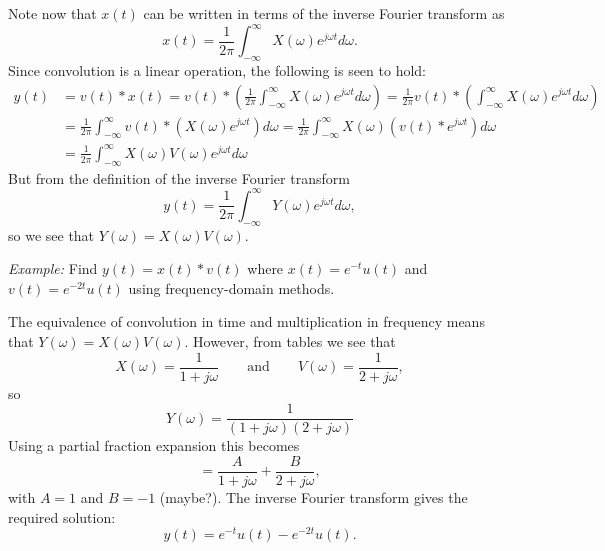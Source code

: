 \documentclass[10pt]{beamer}
\newcommand{\conv}{\ast}
\begin{document}
Note now that $x(t)$ can be written in terms of the inverse Fourier transform as
\begin{equation*}
  x(t) = \frac{1}{2 \pi} \int_{-\infty}^{\infty} X(\omega) e^{j \omega t} d\omega.
\end{equation*}
Since convolution is a linear operation, the following is seen to hold:
\begin{align*}
  y(t) &= v(t) \conv x(t) 
  = v(t) \conv \left( \frac{1}{2 \pi} \int_{-\infty}^{\infty} X(\omega) e^{j \omega t} d\omega \right)
  = \frac{1}{2 \pi} v(t) \conv \left( \int_{-\infty}^{\infty} X(\omega) e^{j \omega t} d\omega \right) \\
  &= \frac{1}{2 \pi} \int_{-\infty}^{\infty} v(t) \conv \left( X(\omega) e^{j \omega t} \right) d\omega 
  = \frac{1}{2 \pi} \int_{-\infty}^{\infty} X(\omega) \left( v(t) \conv e^{j \omega t} \right) d\omega \\
  &= \frac{1}{2 \pi} \int_{-\infty}^{\infty} X(\omega) V(\omega) e^{j \omega t} d\omega 
\end{align*}
But from the definition of the inverse Fourier transform 
\begin{equation*}
  y(t) = \frac{1}{2 \pi} \int_{-\infty}^{\infty} Y(\omega) e^{j \omega t} d\omega,
\end{equation*}
so we see that $Y(\omega) = X(\omega) V(\omega)$.

{\em Example:}  Find $y(t) = x(t) \conv v(t)$ where $x(t) = e^{-t} u(t)$ and $v(t) = e^{-2t} u(t)$ using frequency-domain methods.

The equivalence of convolution in time and multiplication in frequency means that $Y(\omega) = X(\omega) V(\omega)$.  However, from tables we see that
\begin{equation*}
  X(\omega) = \frac{1}{1 + j \omega} \qquad \text{and} \qquad
  V(\omega) = \frac{1}{2 + j \omega},
\end{equation*}
so
\begin{equation*}
  Y(\omega) = \frac{1}{(1 + j \omega)(2 + j \omega)} 
\end{equation*}
Using a partial fraction expansion this becomes
\begin{equation*}
  = \frac{A}{1 + j \omega} + \frac{B}{2 + j \omega},
\end{equation*}
with $A=1$ and $B=-1$ (maybe?).  The inverse Fourier transform gives the required solution:
\begin{equation*}
  y(t) = e^{-t} u(t) - e^{-2t} u(t).
\end{equation*}
\end{document}
